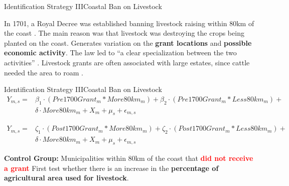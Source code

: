 \documentclass[aspectratio=1610]{beamer}
\begin{document}
\begin{frame}{Identification Strategy III}{Coastal Ban on Livestock}
    \begin{outline}
        \1 In 1701, a Royal Decree was established banning livestock raising within 80km of the coast \parencites[p~.40]{Fausto2014-bh}[p~.198]{Simonsen2005-ps}[p~.460]{Bethell1984-of}.
        \vspace{2mm}
            \2 The main reason was that livestock was destroying the crops being planted on the coast.
        \vspace{2mm}
        \pause 
        \1 Generates variation on the \textbf{grant locations} and \textbf{possible economic activity}.
        \vspace{-1mm}
            \2 The law led to ``a clear specialization between the two activities'' \parencite{Ribeiro2012-lb}.
        \1 Livestock grants are often associated with large estates, since cattle needed the area to roam \parencite[p~.41]{Fausto2014-bh}.
    \end{outline}
\end{frame}

\begin{frame}[t]{Identification Strategy III}{Coastal Ban on Livestock}
    \begin{equation*}
        \begin{split}
        Y_{m,s} = & \beta_1 \cdot (Pre1700Grant_m  * More80km_m) + \beta_2 \cdot (Pre1700Grant_m * Less80km_m) + \\  
        & \delta \cdot  More80km_m + X_{m} + \mu_s + \epsilon_{m,s}
        \end{split}	
      \end{equation*}

      \begin{equation*}
        \begin{split}
        Y_{m,s} = & \zeta_1 \cdot (Post1700Grant_m  * More80km_m) + \zeta_2 \cdot (Post1700Grant_m * Less80km_m) + \\ 
        & \delta \cdot  More80km_m + X_{m} + \mu_s + \epsilon_{m,s}
        \end{split}
      \end{equation*}
    
    \begin{outline}
        \1 \textbf{Control Group:} Municipalities within 80km of the coast that \textcolor{red}{\textbf{did not receive a grant}}
        \vspace{2mm}
        \1 First test whether there is an increase in the \textbf{percentage of agricultural area used for livestock}.
    \end{outline}
\end{frame}
\end{document}
